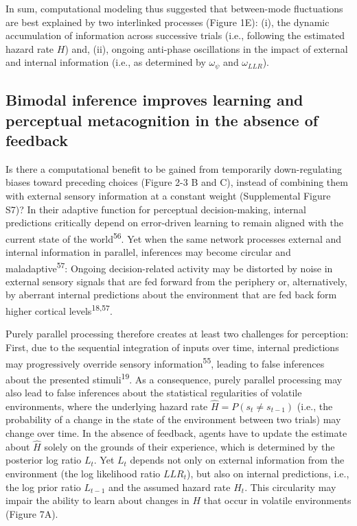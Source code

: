 \documentclass[
]{article}
\begin{document}
In sum, computational modeling thus suggested that between-mode
fluctuations are best explained by two interlinked processes (Figure
1E): (i), the dynamic accumulation of information across successive
trials (i.e., following the estimated hazard rate \(H\)) and, (ii),
ongoing anti-phase oscillations in the impact of external and internal
information (i.e., as determined by \(\omega_{\psi}\) and
\(\omega_{LLR}\)).

\hypertarget{bimodal-inference-improves-learning-and-perceptual-metacognition-in-the-absence-of-feedback}{%
\subsection{Bimodal inference improves learning and perceptual
metacognition in the absence of
feedback}\label{bimodal-inference-improves-learning-and-perceptual-metacognition-in-the-absence-of-feedback}}

Is there a computational benefit to be gained from temporarily
down-regulating biases toward preceding choices (Figure 2-3 B and C),
instead of combining them with external sensory information at a
constant weight (Supplemental Figure S7)? In their adaptive function for
perceptual decision-making, internal predictions critically depend on
error-driven learning to remain aligned with the current state of the
world\textsuperscript{56}. Yet when the same network processes external
and internal information in parallel, inferences may become circular and
maladaptive\textsuperscript{57}: Ongoing decision-related activity may
be distorted by noise in external sensory signals that are fed forward
from the periphery or, alternatively, by aberrant internal predictions
about the environment that are fed back form higher cortical
levels\textsuperscript{18,57}.

Purely parallel processing therefore creates at least two challenges for
perception: First, due to the sequential integration of inputs over
time, internal predictions may progressively override sensory
information\textsuperscript{55}, leading to false inferences about the
presented stimuli\textsuperscript{19}. As a consequence, purely parallel
processing may also lead to false inferences about the statistical
regularities of volatile environments, where the underlying hazard rate
\(\hat{H} = P(s_t \neq s_{t-1})\) (i.e., the probability of a change in
the state of the environment between two trials) may change over time.
In the absence of feedback, agents have to update the estimate about
\(\hat{H}\) solely on the grounds of their experience, which is
determined by the posterior log ratio \(L_t\). Yet \(L_t\) depends not
only on external information from the environment (the log likelihood
ratio \(LLR_t\)), but also on internal predictions, i.e., the log prior
ratio \(L_{t-1}\) and the assumed hazard rate \(H_t\). This circularity
may impair the ability to learn about changes in \(H\) that occur in
volatile environments (Figure 7A).
\end{document}
